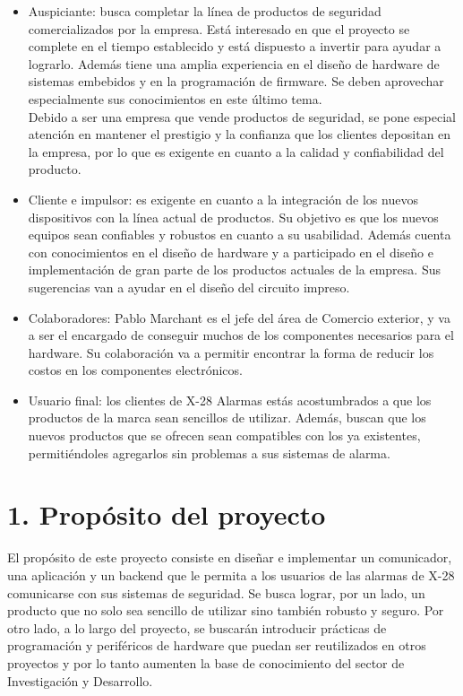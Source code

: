 \documentclass[
11pt, %
codirector, %
]{charter}
\begin{document}
\begin{itemize}
	\item Auspiciante: busca completar la línea de productos de seguridad comercializados por la
empresa. Está interesado en que el proyecto se complete en el tiempo establecido y está dispuesto a invertir para ayudar a lograrlo. Además tiene una amplia experiencia en el diseño de hardware de sistemas embebidos y en la programación de firmware. Se deben aprovechar especialmente sus conocimientos en este último tema.\\
Debido a ser una empresa que vende productos de seguridad, se pone especial atención en mantener el prestigio y la confianza que los clientes depositan en la empresa, por lo que es exigente en cuanto a la calidad y confiabilidad del producto.
	\item Cliente e impulsor: es exigente en cuanto a la integración de los nuevos dispositivos con la línea actual de productos. Su objetivo es que los nuevos equipos sean confiables y robustos en cuanto a su usabilidad. Además cuenta con conocimientos en el diseño de hardware y a participado en el diseño e implementación de gran parte de los productos actuales de la empresa. Sus sugerencias van a ayudar en el diseño del circuito impreso.
	\item Colaboradores: Pablo Marchant es el jefe del área de Comercio exterior, y va a ser el encargado de conseguir muchos de los componentes necesarios para el hardware. Su colaboración va a permitir encontrar la forma de reducir los costos en los componentes electrónicos.
	\item Usuario final: los clientes de X-28 Alarmas estás acostumbrados a que los productos de la marca sean sencillos de utilizar. Además, buscan que los nuevos productos que se ofrecen sean compatibles con los ya existentes, permitiéndoles agregarlos sin problemas a sus sistemas de alarma.
\end{itemize}




\section{1. Propósito del proyecto}
\label{sec:proposito}

El propósito de este proyecto consiste en diseñar e implementar un comunicador, una aplicación y un backend que le permita a los usuarios de las alarmas de X-28 comunicarse con sus sistemas de seguridad. Se busca lograr, por un lado, un producto que no solo sea sencillo de utilizar sino también robusto y seguro. Por otro lado, a lo largo del proyecto, se buscarán introducir prácticas de programación y periféricos de hardware que puedan ser reutilizados en otros proyectos  y por lo tanto aumenten la base de conocimiento del sector de Investigación y Desarrollo.
\end{document}
